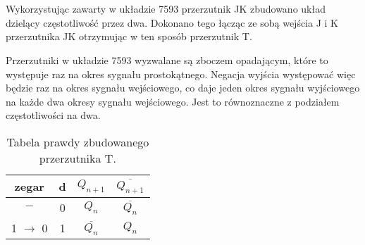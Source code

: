 \section{}
Wykorzystując zawarty w układzie 7593 przerzutnik JK zbudowano układ dzielący częstotliwość przez dwa.
Dokonano tego łącząc ze sobą wejścia J i K przerzutnika JK otrzymując w ten sposób przerzutnik T.

Przerzutniki w układzie 7593 wyzwalane są zboczem opadającym, które to występuje raz na okres sygnału prostokątnego.
Negacja wyjścia występować więc będzie raz na okres sygnału wejściowego, co daje jeden okres sygnału wyjściowego na każde dwa okresy sygnału wejściowego. Jest to równoznaczne z podziałem częstotliwości na dwa.

\begin{table}[H]
    \centering
    \begin{tabular}{c|c||c|c}
        \hline
        zegar               & d & \(Q_{n+1}\)        & \(\overline{Q_{n+1}}\)
        \\ \hline\hline
        \(-\)               & 0 & \(Q_n\)            & \(\overline{Q_n}\)     \\ \hline
        1 \(\rightarrow\) 0 & 1 & \(\overline{Q_n}\) & \(Q_n\)                \\ \hline
    \end{tabular}
    \caption{Tabela prawdy zbudowanego przerzutnika T.}
\end{table}